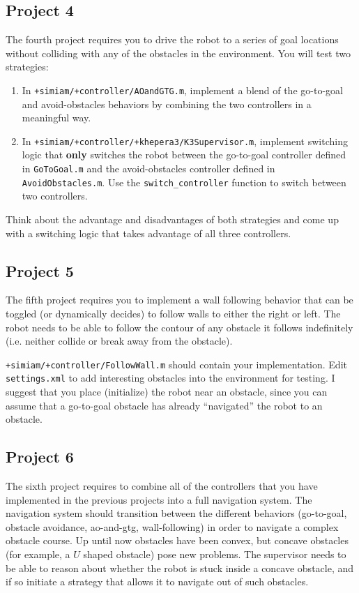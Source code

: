 \documentclass[10pt]{article}
\begin{document}
\subsection*{Project 4}
The fourth project requires you to drive the robot to a series of goal locations without colliding with any of the obstacles in the environment. You will test two strategies:
\begin{enumerate}
  \item In \texttt{+simiam/+controller/AOandGTG.m}, implement a blend of the go-to-goal and avoid-obstacles behaviors by combining the two controllers in a meaningful way.
  \item In \texttt{+simiam/+controller/+khepera3/K3Supervisor.m}, implement switching logic that \textbf{only} switches the robot between the go-to-goal controller defined in \texttt{GoToGoal.m} and the avoid-obstacles controller defined in \texttt{AvoidObstacles.m}. Use the \texttt{switch\_controller} function to switch between two controllers.
\end{enumerate}

Think about the advantage and disadvantages of both strategies and come up with a switching logic that takes advantage of all three controllers.

\subsection*{Project 5}
The fifth project requires you to implement a wall following behavior that can be toggled (or dynamically decides) to follow walls to either the right or left. The robot needs to be able to follow the contour of any obstacle it follows indefinitely (i.e. neither collide or break away from the obstacle).

\texttt{+simiam/+controller/FollowWall.m} should contain your implementation. Edit \texttt{settings.xml} to add interesting obstacles into the environment for testing. I suggest that you place (initialize) the robot near an obstacle, since you can assume that a go-to-goal obstacle has already ``navigated'' the robot to an obstacle.

\subsection*{Project 6}
The sixth project requires to combine all of the controllers that you have implemented in the previous projects into a full navigation system. The navigation system should transition between the different behaviors (go-to-goal, obstacle avoidance, ao-and-gtg, wall-following) in order to navigate a complex obstacle course. Up until now obstacles have been convex, but concave obstacles (for example, a $U$ shaped obstacle) pose new problems. The supervisor needs to be able to reason about whether the robot is stuck inside a concave obstacle, and if so initiate a strategy that allows it to navigate out of such obstacles.
\end{document}
